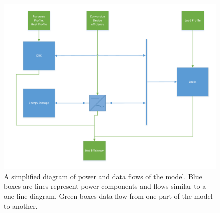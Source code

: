 \begin{figure}[ht]
	\centering
	\caption{A simplified diagram of power and data flows of the model. Blue boxes are lines represent power components and flows similar to a one-line diagram. Green boxes data flow from one part of the model to another.}
	\label{fig:abridged_flow_diagram}
	
	\includegraphics[width=\textwidth]{figures/Abridged Pilgrim Model Flow diagram - AC bus.pdf}

\end{figure}